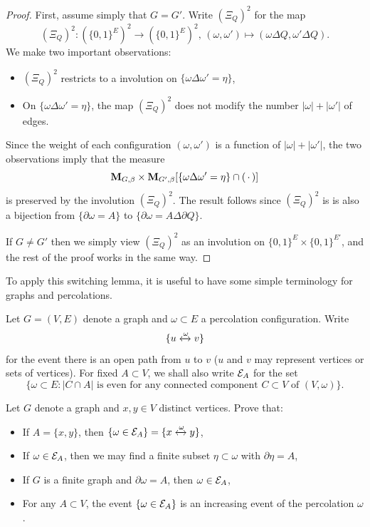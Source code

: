 \begin{proof}
    First, assume simply that $G=G'$.
    Write $(\Xi_Q)^2$ for the map
    \[
        (\Xi_Q)^2:
        (\{0,1\}^E)^2
        \to
        (\{0,1\}^E)^2
        ,\,(\omega,\omega')\mapsto (\omega\Delta Q,\omega'\Delta Q).
    \]
    We make two important observations:
    \begin{itemize}
        \item $(\Xi_Q)^2$ restricts to a involution on $\{\omega\Delta\omega'=\eta\}$,
        \item On $\{\omega\Delta\omega'=\eta\}$, the map $(\Xi_Q)^2$ does not modify the
            number $|\omega|+|\omega'|$
            of edges.
    \end{itemize}
    Since the weight of each configuration $(\omega,\omega')$ is a function of $|\omega|+|\omega'|$,
    the two observations imply that
    the measure \[\mathbf{M}_{G,\beta}\times\mathbf{M}_{G',\beta}
    [\{\omega\Delta\omega'=\eta\}\cap (\,\cdot\,)]\] is preserved by the involution
    $(\Xi_Q)^2$.
    The result follows since $(\Xi_Q)^2$ is is also a bijection from $\{\partial\omega= A\}$
    to $\{\partial\omega= A\Delta \partial Q\}$.

    If $G\neq G'$ then we simply view $(\Xi_Q)^2$
    as an involution on $\{0,1\}^E\times\{0,1\}^{E'}$,
    and the rest of the proof works in the same way.
\end{proof}

To apply this switching lemma,
it is useful to have some simple terminology for graphs and percolations.

\begin{definition}
    Let $G=(V,E)$ denote a graph and $\omega\subset E$ a percolation configuration.
    Write \[\{u\xleftrightarrow{\omega}v\}\]
    for the event there is an open path from $u$ to $v$
    ($u$ and $v$ may represent vertices or sets of vertices).
    For fixed $A\subset V$, we shall also write $\mathcal E_A$ for the set
    \[
        \{\omega\subset E:\text{$|C\cap A|$ is even for any connected component $C\subset
        V$ of $(V,\omega)$}\}.
    \]
\end{definition}

\begin{exercise}
    \label{exo:basic_perco}
    Let $G$ denote a graph and
    $x,y\in V$  distinct vertices. Prove that:
    \begin{itemize}
        \item If $A=\{x,y\}$, then $\{\omega\in\mathcal E_A\}=\{x\xleftrightarrow{\omega}y\}$,
        \item If $\omega\in\mathcal E_A$, then we may find a finite subset $\eta\subset\omega$
            with $\partial\eta=A$,
        \item If $G$ is a finite graph and $\partial\omega=A$, then $\omega\in\mathcal E_A$,
        \item For any $A\subset V$, the event $\{\omega\in\mathcal E_A\}$ is an increasing
            event of the percolation $\omega$.
    \end{itemize}
\end{exercise}

